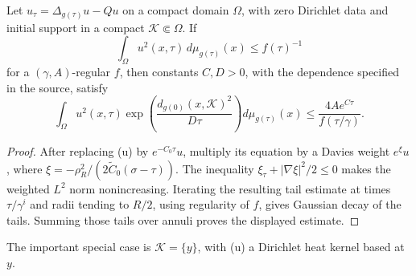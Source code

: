 \begin{lemma}
\label{lem:chow-iii-weighted-l2-heat-estimate}


Let \(u_\tau=\Delta_{g(\tau)}u-Qu\) on a compact domain \(\Omega\), with
zero Dirichlet data and initial support in a compact \(\mathcal K\Subset\Omega\).
If
\[
 \int_\Omega u^2(x,\tau)\,d\mu_{g(\tau)}(x)\le f(\tau)^{-1}
\]
for a \((\gamma,A)\)-regular \(f\), then constants \(C,D>0\), with the
dependence specified in the source, satisfy
\[
 \int_\Omega u^2(x,\tau)
 \exp\!\left(\frac{d_{g(0)}(x,\mathcal K)^2}{D\tau}\right)
 d\mu_{g(\tau)}(x)
 \le \frac{4Ae^{C\tau}}{f(\tau/\gamma)}.
\]
\end{lemma}
\begin{proof}
\sketch After replacing (u) by \(e^{-C_0\tau}u\), multiply its equation by a
Davies weight \(e^\xi u\), where
\(\xi=-\rho_R^2/(2\widetilde C_0(\sigma-\tau))\).  The inequality
\(\xi_\tau+|\nabla\xi|^2/2\le0\) makes the weighted \(L^2\) norm
nonincreasing.  Iterating the resulting tail estimate at times
\(\tau/\gamma^i\) and radii tending to \(R/2\), using regularity of \(f\),
gives Gaussian decay of the tails.  Summing those tails over annuli proves
the displayed estimate.
\end{proof}

\begin{remark}
\label{rem:chow-iii-weighted-l2-point-source}


The important special case is \(\mathcal K=\{y\}\), with (u) a Dirichlet
heat kernel based at \(y\).
\end{remark}

